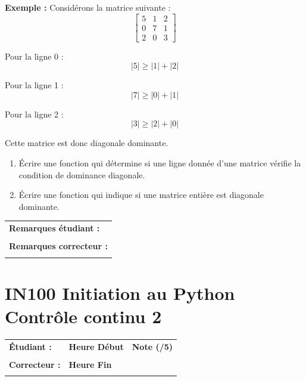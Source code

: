 \documentclass[a4paper,11pt]{article}
\begin{document}
\textbf{Exemple :}  
Considérons la matrice suivante :
\[
\begin{bmatrix}
5 & 1 & 2 \\
0 & 7 & 1 \\
2 & 0 & 3
\end{bmatrix}
\]

Pour la ligne 0 :
\[
|5| \ge |1| + |2|
\]

Pour la ligne 1 :
\[
|7| \ge |0| + |1|
\]

Pour la ligne 2 :
\[
|3| \ge |2| + |0|
\]

Cette matrice est donc diagonale dominante.

\vspace{-0.3 cm}


\begin{enumerate}
  \item[1.] Écrire une fonction qui détermine si une ligne donnée d’une matrice vérifie la condition de dominance diagonale.
  
  \item[2.] Écrire une fonction qui indique si une matrice entière est diagonale dominante.
\end{enumerate}


\vspace{-0.4 cm}
\begin{table}[h!]
\centering
\renewcommand{\arraystretch}{1.4} %
\begin{tabular}{|p{15cm}|}
\hline
\textbf{Remarques étudiant :}    \\
 \\
\hline
\textbf{Remarques correcteur :}  \\
 \\
\hline
\end{tabular}
\end{table}

\newpage


\section*{\center IN100 Initiation au Python\\
Contrôle continu 2}

\vspace{-0.3 cm}

\begin{table}[h!]
\centering
\renewcommand{\arraystretch}{1.4} %
\begin{tabular}{|p{10cm}|p{3cm}|p{2cm}|}
\hline
\textbf{Étudiant :} & \textbf{Heure Début }  & \textbf{Note (/5) }  \\
& & \\
\hline
\textbf{Correcteur :} & \textbf{Heure Fin } & \\
& & \\
\hline

\hline
\end{tabular}
\end{table}
\vspace{-0.4 cm}
\end{document}
